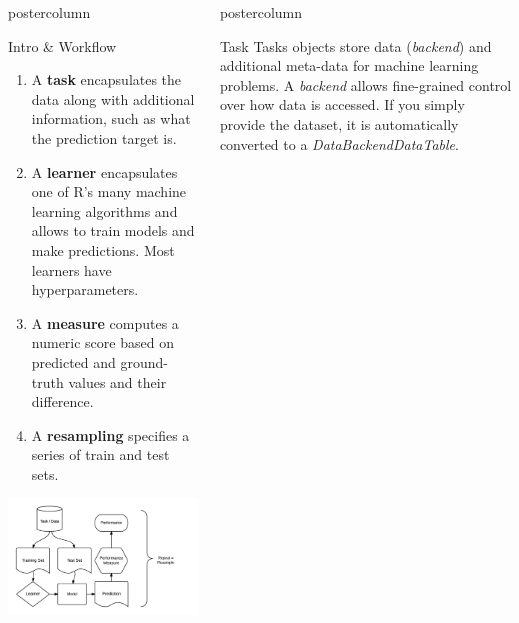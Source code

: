 \documentclass{beamer}
\newlength{\columnheight} %
\begin{document}
\begin{frame}[fragile]{}
\begin{columns}
\begin{column}{.245\textwidth}
\begin{beamercolorbox}[center]{postercolumn}
\begin{minipage}{.98\textwidth}
{\begin{myblock}{Intro \& Workflow}
					\begin{enumerate}
						\item A \textbf{task} encapsulates the data along with additional information, such as 
						what the prediction target is.
						\item A \textbf{learner} encapsulates one of R's many machine learning algorithms and allows to train models and make predictions. Most learners have hyperparameters.
						\item A \textbf{measure} computes a numeric score based on predicted and ground-truth values and their difference.
						\item A \textbf{resampling} specifies a series of train and test sets.
					\end{enumerate}
          \end{myblock}
				  \includegraphics[width=\textwidth]{img/ml_abstraction.png}
				}
			\end{minipage}
		\end{beamercolorbox}
	\end{column}
	\begin{column}{.245\textwidth}
		\begin{beamercolorbox}[center]{postercolumn}
			\begin{minipage}{.98\textwidth}
				\parbox[t][\columnheight]{\textwidth}{
				  \begin{myblock}{Task}
						Tasks objects store data (\textit{backend}) and additional meta-data for machine learning problems. A \textit{backend} allows fine-grained control over how data is accessed. If you simply provide the dataset, it is automatically converted to a \textit{DataBackendDataTable}.
						\\
						\begin{codebox}

\end{codebox}
\end{myblock}}
\end{minipage}
\end{beamercolorbox}
\end{column}
\end{columns}
\end{frame}
\end{document}
